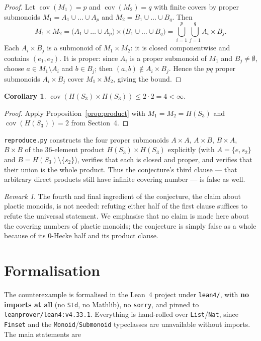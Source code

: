 \documentclass[11pt]{article}
\newtheorem{corollary}[theorem]{Corollary}
\theoremstyle{definition}
\theoremstyle{remark}
\newtheorem{remark}[theorem]{Remark}
\newcommand{\cov}{\operatorname{cov}}
\begin{document}
\begin{proof}
Let $\cov(M_1)=p$ and $\cov(M_2)=q$ with finite covers by proper submonoids
$M_1=A_1\cup\dots\cup A_p$ and $M_2=B_1\cup\dots\cup B_q$. Then
\[
M_1\times M_2=\bigl(A_1\cup\dots\cup A_p\bigr)\times
\bigl(B_1\cup\dots\cup B_q\bigr)
=\bigcup_{i=1}^{p}\bigcup_{j=1}^{q} A_i\times B_j .
\]
Each $A_i\times B_j$ is a submonoid of $M_1\times M_2$: it is closed
componentwise and contains $(e_1,e_2)$. It is proper: since $A_i$ is a proper
submonoid of $M_1$ and $B_j\ne\emptyset$, choose $a\in M_1\setminus A_i$ and
$b\in B_j$; then $(a,b)\notin A_i\times B_j$. Hence the $pq$ proper submonoids
$A_i\times B_j$ cover $M_1\times M_2$, giving the bound.
\end{proof}

\begin{corollary}\label{cor:prod}
$\cov(H(S_3)\times H(S_3))\le 2\cdot 2=4<\infty$.
\end{corollary}

\begin{proof}
Apply Proposition~\ref{prop:product} with $M_1=M_2=H(S_3)$ and
$\cov(H(S_3))=2$ from Section~4.
\end{proof}

\texttt{reproduce.py} constructs the four proper submonoids
$A\times A$, $A\times B$, $B\times A$, $B\times B$ of the $36$-element product
$H(S_3)\times H(S_3)$ explicitly (with $A=\{e,s_2\}$ and $B=H(S_3)\setminus
\{s_2\}$), verifies that each is closed and proper, and verifies that their
union is the whole product. Thus the conjecture's third clause --- that
arbitrary direct products still have infinite covering number --- is false as
well.

\begin{remark}
The fourth and final ingredient of the conjecture, the claim about plactic
monoids, is not needed: refuting either half of the first clause suffices to
refute the universal statement. We emphasise that no claim is made here about
the covering numbers of plactic monoids; the conjecture is simply false as a
whole because of its $0$-Hecke half and its product clause.
\end{remark}

\section{Formalisation}

The counterexample is formalised in the Lean~4 project under \texttt{lean4/},
with \textbf{no imports at all} (no \texttt{Std}, no Mathlib), no
\texttt{sorry}, and pinned to \texttt{leanprover/lean4:v4.33.1}. Everything is
hand-rolled over \texttt{List}/\texttt{Nat}, since \texttt{Finset} and the
\texttt{Monoid}/\texttt{Submonoid} typeclasses are unavailable without imports.
The main statements are
\end{document}
